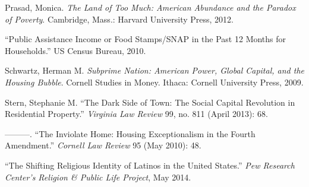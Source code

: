 \documentclass[
]{article}
\begin{document}
\leavevmode\hypertarget{ref-prasad2012land}{}%
Prasad, Monica. \emph{The Land of Too Much: American Abundance and the Paradox of Poverty}. Cambridge, Mass.: Harvard University Press, 2012.

\leavevmode\hypertarget{ref-2010public}{}%
``Public Assistance Income or Food Stamps/SNAP in the Past 12 Months for Households.'' US Census Bureau, 2010.

\leavevmode\hypertarget{ref-schwartz2009subprime}{}%
Schwartz, Herman M. \emph{Subprime Nation: American Power, Global Capital, and the Housing Bubble}. Cornell Studies in Money. Ithaca: Cornell University Press, 2009.

\leavevmode\hypertarget{ref-stern2013dark}{}%
Stern, Stephanie M. ``The Dark Side of Town: The Social Capital Revolution in Residential Property.'' \emph{Virginia Law Review} 99, no. 811 (April 2013): 68.

\leavevmode\hypertarget{ref-stern2010inviolate}{}%
---------. ``The Inviolate Home: Housing Exceptionalism in the Fourth Amendment.'' \emph{Cornell Law Review} 95 (May 2010): 48.

\leavevmode\hypertarget{ref-2014shifting}{}%
``The Shifting Religious Identity of Latinos in the United States.'' \emph{Pew Research Center's Religion \& Public Life Project}, May 2014.
\end{document}
